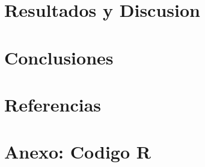 \documentclass[11pt, a4paper]{article}
\begin{document}
\section{Resultados y Discusion}

\section{Conclusiones}

\section*{Referencias}

\section*{Anexo: Codigo R}
\end{document}
